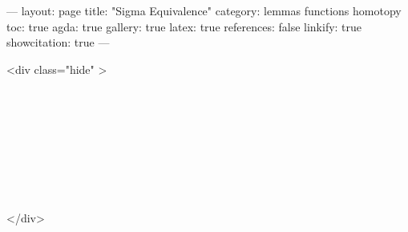 ---
layout: page
title: "Sigma Equivalence"
category: lemmas functions homotopy
toc: true
agda: true
gallery: true
latex: true
references: false
linkify: true
showcitation: true
---

<div class="hide" >
\begin{code}%
\>[0]\AgdaSymbol{\{-\#}\AgdaSpace{}%
\AgdaSpace{}%
\AgdaSpace{}%
\AgdaSymbol{\#-\}}\<%
\\
\>[0]\AgdaSpace{}%
\AgdaSpace{}%
\<%
\\
\>[0]\AgdaSpace{}%
\AgdaSpace{}%
\<%
\\
%
\\[\AgdaEmptyExtraSkip]%
\>[0]\AgdaSpace{}%
\AgdaSpace{}%
\<%
\\
\>[0]\AgdaSpace{}%
\AgdaSpace{}%
\<%
\\
%
\\[\AgdaEmptyExtraSkip]%
\>[0]\AgdaSpace{}%
\AgdaSpace{}%
\<%
\end{code}
</div>


\begin{code}%
\>[0]\AgdaSpace{}%
\AgdaSpace{}%
\AgdaSymbol{\{}\AgdaSpace{}%
\AgdaSymbol{\}}\AgdaSpace{}%
\AgdaSymbol{\{}\AgdaSpace{}%
\AgdaSymbol{:}\AgdaSpace{}%
\AgdaSpace{}%
\AgdaSymbol{\}}\AgdaSpace{}%
\AgdaSymbol{\{}\AgdaSpace{}%
\AgdaSymbol{:}\AgdaSpace{}%
\AgdaSpace{}%
\AgdaSpace{}%
\AgdaSpace{}%
\AgdaSymbol{\}}\AgdaSpace{}%
\<%
\end{code}

